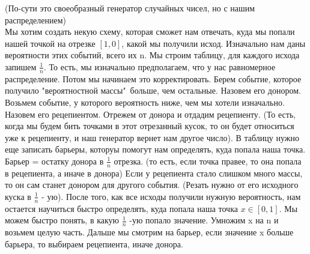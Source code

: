 \documentclass[discrete.tex]{subfiles}
\begin{document}
\begin{definition} 
    (По-сути это своеобразный генератор случайных чисел, но с нашим распределением)\\
    Мы хотим создать некую схему, которая сможет нам отвечать, куда мы попали нашей точкой
    на отрезке $[1, 0]$, какой мы получили исход. Изначально нам даны вероятности этих 
    событий, всего их n. Мы строим таблицу, для каждого исхода запишем $\frac{1}{n}$. То 
    есть, мы изначально предполагаем, что у нас равномерное распределение. Потом мы
    начинаем это корректировать. Берем событие, которое получило "вероятностной массы"\ 
    больше, чем остальные. Назовем его донором. Возьмем событие, у которого вероятность 
    ниже, чем мы хотели изначально. Назовем его рецепиентом. Отрежем от донора и отдадим
    рецепиенту. (То есть, когда мы будем бить точками в этот отрезанный кусок, то он
    будет относиться уже к рецепиенту, и наш генератор вернет нам другое число).
    В таблицу нужно еще записать барьеры, которуы помогут нам определять, куда попала 
    наша точка. Барьер = остатку донора в $\frac{1}{n}$ отрезка. (то есть, 
    если точка правее, то она попала в рецепиента, а иначе в донора)
    Если у 
    рецепиента стало слишком много массы, то он сам станет донором для другого события. 
    (Резать нужно от его исходного куска в $\frac{1}{n}$ - ую). После того, как 
    все исходы получили нужную вероятность, нам остается научиться быстро определять, 
    куда попала наша точка $x \in [0, 1]$. Мы можем быстро понять, в какую $\frac{1}{n}$
    -ую попало значение. Умножим x на n и возьмем целую часть. Дальше мы смотрим на 
    барьер, если значение x больше барьера, то выбираем рецепиента, иначе донора.
\end{definition}
\end{document}
